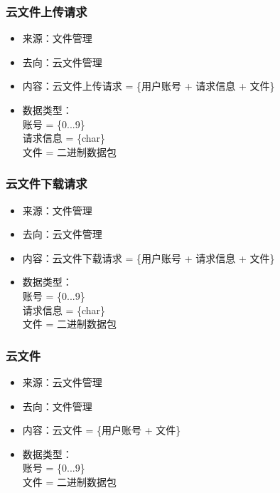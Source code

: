             \subsubsection{云文件上传请求}
            \begin{itemize}
            \item 来源：文件管理
            \item 去向：云文件管理
            \item 内容：云文件上传请求 = \{用户账号 + 请求信息 + 文件\}
            \item 数据类型：\\
            账号 = \{0...9\}\\
            请求信息 = \{char\}\\
            文件 = 二进制数据包\\
            \end{itemize}

            \subsubsection{云文件下载请求}
            \begin{itemize}
            \item 来源：文件管理
            \item 去向：云文件管理
            \item 内容：云文件下载请求 = \{用户账号 + 请求信息 + 文件\}
            \item 数据类型：\\
            账号 = \{0...9\}\\
            请求信息 = \{char\}\\
            文件 = 二进制数据包\\
            \end{itemize}

            \subsubsection{云文件}
            \begin{itemize}
            \item 来源：云文件管理
            \item 去向：文件管理
            \item 内容：云文件 = \{用户账号 + 文件\}
            \item 数据类型：\\
            账号 = \{0...9\}\\
            文件 = 二进制数据包\\
            \end{itemize}
